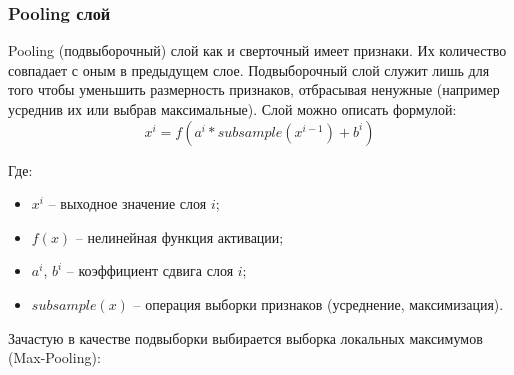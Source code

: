 \subsubsection{Pooling слой}

Pooling (подвыборочный) слой как и сверточный имеет признаки. Их количество совпадает с оным в предыдущем слое. Подвыборочный слой служит лишь для того чтобы уменьшить размерность признаков, отбрасывая ненужные (например усреднив их или выбрав максимальные). Слой можно описать формулой:
$$
x^i = f(a^i*subsample(x^{i-1})+b^i)
$$

Где:
\begin{itemize}
    \item $x^i$ -- выходное значение слоя $i$;
    \item $f(x)$ -- нелинейная функция активации;
    \item $a^i$, $b^i$ -- коэффициент сдвига слоя $i$;
    \item $subsample(x)$ -- операция выборки признаков (усреднение, максимизация).
\end{itemize}

Зачастую в качестве подвыборки выбирается выборка локальных максимумов (Max-Pooling):

